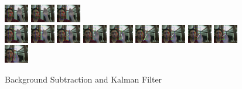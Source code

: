 \documentclass[12pt]{article}
\begin{document}
\begin{figure}[H]
\includegraphics[width=40px, height=30px]{../data/nobgkalman/img0037.jpg}
\includegraphics[width=40px, height=30px]{../data/nobgkalman/img0038.jpg}
\includegraphics[width=40px, height=30px]{../data/nobgkalman/img0039.jpg} \\
\includegraphics[width=40px, height=30px]{../data/nobgkalman/img0040.jpg}
\includegraphics[width=40px, height=30px]{../data/nobgkalman/img0041.jpg}
\includegraphics[width=40px, height=30px]{../data/nobgkalman/img0042.jpg}
\includegraphics[width=40px, height=30px]{../data/nobgkalman/img0043.jpg}
\includegraphics[width=40px, height=30px]{../data/nobgkalman/img0044.jpg}
\includegraphics[width=40px, height=30px]{../data/nobgkalman/img0045.jpg}
\includegraphics[width=40px, height=30px]{../data/nobgkalman/img0046.jpg}
\includegraphics[width=40px, height=30px]{../data/nobgkalman/img0047.jpg}
\includegraphics[width=40px, height=30px]{../data/nobgkalman/img0048.jpg}
\includegraphics[width=40px, height=30px]{../data/nobgkalman/img0049.jpg}
\label{seq-nobgkalman}
\caption{Background Subtraction and Kalman Filter}
\end{figure}
\end{document}
